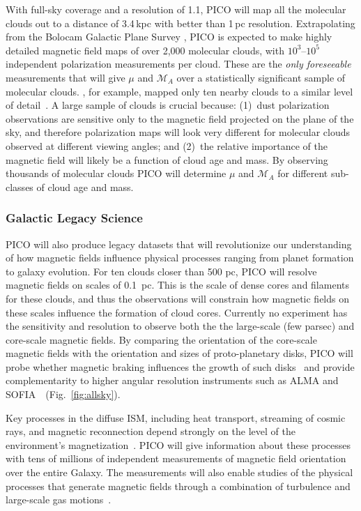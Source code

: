 \documentclass[PICOReport.tex]{subfiles}
\begin{document}
With full-sky coverage and a resolution of 1.1\arcmin, PICO will map all the molecular clouds out to a distance of 3.4\,kpc with better than 1\,pc resolution.  Extrapolating from the Bolocam Galactic Plane Survey \citep[BGPS,][]{EllsworthBowers2015}, PICO is expected to make highly detailed magnetic field maps of over 2,000 molecular clouds, with $10^3$--$10^5$  independent polarization measurements per cloud. These are the {\it only foreseeable} measurements that will give $\mu$ and $\mathcal{M}_A$ over a statistically significant sample of molecular clouds. \planck , for example, mapped only ten nearby clouds to a similar level of detail~\citep{Planck:XXXV}. A large sample of clouds is crucial because: (1)~dust polarization observations are sensitive only to the magnetic field projected on the plane of the sky, and therefore polarization maps will look very different for molecular clouds observed at different viewing angles; and (2)~the relative importance of the magnetic field will likely be a function of cloud age and mass. By observing thousands of molecular clouds PICO will determine $\mu$ and  $\mathcal{M}_A$ for different sub-classes of cloud age and mass. 

\subsubsection{Galactic Legacy Science}
\label{sec:galactic_legacy}

PICO will also produce legacy datasets that will revolutionize our understanding of how magnetic fields influence physical processes ranging from planet formation to galaxy evolution.  For ten clouds closer than 500 pc, PICO will resolve magnetic fields on scales of 0.1~pc. This is the scale of dense cores and filaments for these clouds, and thus the observations will constrain how magnetic fields on these scales influence the formation of cloud cores.  Currently no experiment has the sensitivity and resolution to observe both the the large-scale (few parsec) and core-scale magnetic fields. By comparing the orientation of the core-scale magnetic fields with the orientation and sizes of proto-planetary disks, PICO will probe whether magnetic braking influences the growth of such disks~\citep{allen_2003,li_2014} and provide complementarity to higher angular resolution instruments such as ALMA and SOFIA~\citep{Bacciotti2018ApJ,Harper2018}~(Fig.~\ref{fig:allsky}).

Key processes in the diffuse ISM, including heat transport, streaming of cosmic rays, and magnetic reconnection depend strongly on the level of the environment's magnetization~\citep{Lazarian:2006,Lazarian:2016,Lazarian_Vishniac:1999}.
PICO will give information about these processes with tens of millions of independent measurements of magnetic field orientation over the entire Galaxy. The measurements will also enable studies of the physical processes that generate magnetic fields through a combination of turbulence and large-scale gas motions~\citep{Xu_2018}.
\end{document}
